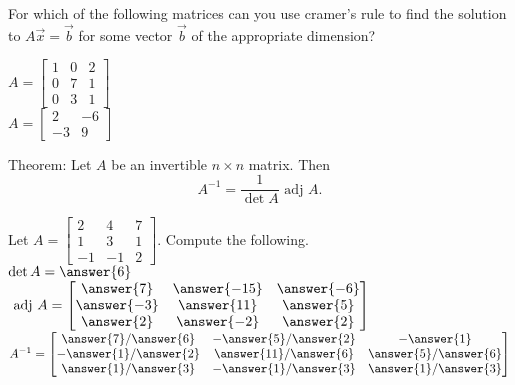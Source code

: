 \documentclass{ximera}
\newcommand{\adj}{\text{ adj }}
\begin{document}
        \begin{question} For which of the following matrices can you use cramer's rule to find the solution to $A\vec{x} = \vec{b}$ for some vector $\vec{b}$ of the appropriate dimension? 
        	
        	\begin{multipleChoice}
       	\choice[correct] $A = \begin{bmatrix} 1 &0 &2\\ 0&7& 1 \\0&3&1\end{bmatrix}$ \vspace{5pt}\\
       	\choice $A = \begin{bmatrix} 2 &-6\\ -3& 9\end{bmatrix}$ \vspace{5pt}\\	
       	  		\end{multipleChoice}
       	  		
       	  		
       	  		
       	  	\end{question}	
          \begin{question} Theorem: Let $A$ be an invertible $n\times n$ matrix. Then $$A^{-1} = \dfrac{1}{\det A}  \adj  A.$$
          	
          Let $A = \begin{bmatrix} 2& 4& 7\\ 1& 3&1\\ -1&-1&2\end{bmatrix}$. Compute the following.\vspace{10pt}\\
          
          $\det A = \answer{6}$\vspace{10pt}\\
          
          $\adj A = \begin{bmatrix} 
          \answer{7} & \answer{-15} &\answer{-6}\\
          \answer{-3} & \answer{11} &\answer{5}\\
          \answer{2} & \answer{-2} &\answer{2} \end{bmatrix}$\vspace{10pt}\\
          
      
          
          $A^{-1} =   \begin{bmatrix} 
          	\answer{7}/\answer{6} & -\answer{5}/\answer{2} &-\answer{1}\\
          	-\answer{1} /\answer{2}& \answer{11}/\answer{6} &\answer{5}/\answer{6}\\
          	\answer{1}/\answer{3} & -\answer{1}/\answer{3} &\answer{1}/\answer{3} \end{bmatrix}$
          	
          	
          \end{question}	
  
\end{document}

